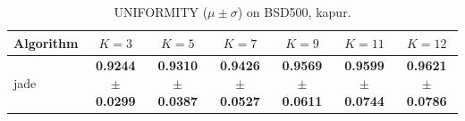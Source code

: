 \begin{table}[htbp]
\centering
\caption{UNIFORMITY ($\mu \pm \sigma$) on BSD500, kapur.}
\label{tab:exp1-kapur-uniformity}
\begin{tabular}{lcccccc}
\toprule
Algorithm & $K=3$ & $K=5$ & $K=7$ & $K=9$ & $K=11$ & $K=12$ \\
\midrule
jade & \textbf{0.9244 $\pm$ 0.0299} & \textbf{0.9310 $\pm$ 0.0387} & \textbf{0.9426 $\pm$ 0.0527} & \textbf{0.9569 $\pm$ 0.0611} & \textbf{0.9599 $\pm$ 0.0744} & \textbf{0.9621 $\pm$ 0.0786} \\
\bottomrule
\end{tabular}
\end{table}